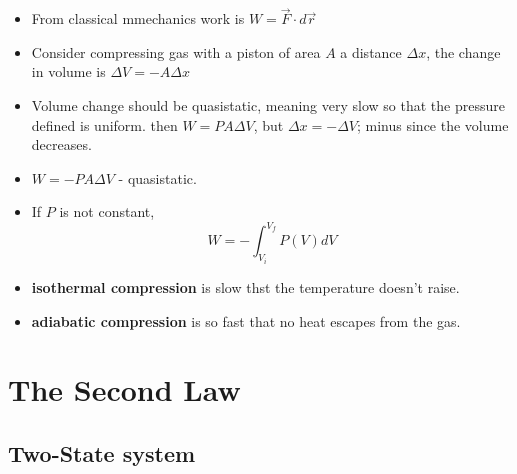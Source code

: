 \documentclass{book}
\begin{document}
\begin{itemize}
 \item From classical mmechanics work is $W = \vec{F} \cdot d\vec{r}$
 \item  Consider compressing gas with a piston of area $A$ a distance $\Delta{x}$,
   the change in volume is $\Delta{V} = -A \Delta{x}$
 \item Volume change should be quasistatic, meaning very slow so that the pressure defined is uniform.
     then $W = P A \Delta{V}$, but $\Delta{x} = - \Delta{V}$; minus since the volume decreases.
 \item $W =- P A \Delta{V}$  -  quasistatic.
 \item If $P$ is not constant, $$W = - \int_{V_i}^{V_f} P(V) dV$$
  \item \textbf{isothermal compression} is slow thst the temperature doesn't raise.
  \item \textbf{adiabatic compression} is so fast that no heat escapes from the gas.
\end{itemize}


\chapter{The Second Law}

\section{Two-State system}%
\label{sec:two state}
\end{document}
